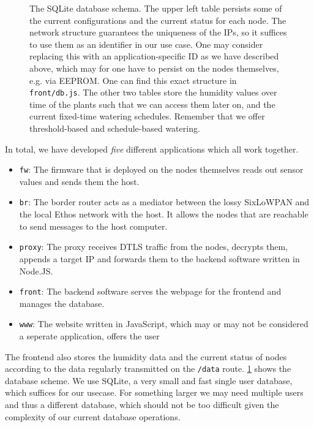\documentclass[acmtog, language=english, nonacm]{acmart}
\begin{document}
\begin{figure}[!hbtp]
\begin{tikzpicture}[>=stealth, semithick, scale=0.95]
        \end{tikzpicture}
        \caption{The SQLite database schema. The upper left table persists some of the current configurations and the current status for each node. The network structure guarantees the uniqueness of the IPs, so it suffices to use them as an identifier in our use case. One may consider replacing this with an application-specific ID as we have described above, which may for one have to persist on the nodes themselves, e.g. via EEPROM. One can find this exact structure in \texttt{front/db.js}. The other two tables store the humidity values over time of the plants such that we can access them later on, and the current fixed-time watering schedules. Remember that we offer threshold-based and schedule-based watering.}
        \label{fig:db_scheme}
    \end{figure}

    In total, we have developed \emph{five} different applications which all work together.
    \begin{itemize}
        \item \texttt{fw}: The firmware that is deployed on the nodes themselves reads out sensor values and sends them the host.
        \item \texttt{br}: The border router acts as a mediator between the lossy SixLoWPAN and the local Ethos network with the host. It allows the nodes that are reachable to send messages to the host computer.
        \item \texttt{proxy}: The proxy receives DTLS traffic from the nodes, decrypts them, appends a target IP and forwards them to the backend software written in Node.JS.
        \item \texttt{front}: The backend software serves the webpage for the frontend and manages the database.
        \item \texttt{www}: The website written in JavaScript, which may or may not be considered a seperate application, offers the user
    \end{itemize}

    The frontend also stores the humidity data and the current status of nodes according to the data regularly transmitted on the \texttt{/data} route. \cref{fig:db_scheme} shows the database scheme. We use SQLite, a very small and fast single user database, which suffices for our usecase. For something larger we may need multiple users and thus a different database, which should not be too difficult given the complexity of our current database operations.
\end{document}
